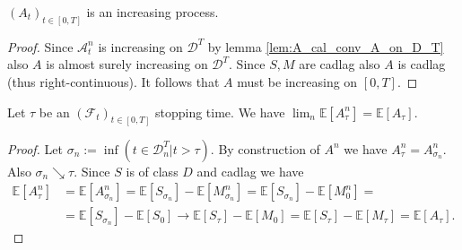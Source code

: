 \begin{lemma}\label{lem:A_increasing}
  $(A_t)_{t\in[0,T]}$ is an increasing process.
\end{lemma}
\begin{proof}
  Since $\mathcal{A}^n_t$ is increasing on $\mathcal{D}^T$ by lemma \ref{lem:A_cal_conv_A_on_D_T} also $A$ is almost surely increasing on $\mathcal{D}^T$.
  Since $S,M$ are cadlag also $A$ is cadlag (thus right-continuous). It follows that $A$ must be increasing on $[0,T]$.
\end{proof}

\begin{lemma}\label{lem:lim_Exp_A_n_tau_is_Exp_A_tau}
  Let $\tau$ be an $(\mathcal{F}_t)_{t\in[0,T]}$ stopping time. We have $\lim_n\mathbb{E}[A^n_\tau]=\mathbb{E}[A_\tau]$.
\end{lemma}
\begin{proof}
  Let $\sigma_n:=\inf\left(t\in\mathcal{D}^T_n\vert t>\tau\right)$. By construction of $A^n$ we have $A^n_\tau=A^n_{\sigma_n}$.
  Also $\sigma_n\searrow\tau$. Since $S$ is of class $D$ and cadlag we have
  \begin{align*}
    \mathbb{E}[A^n_\tau]&=\mathbb{E}[A^n_{\sigma_n}]=\mathbb{E}[S_{\sigma_n}]-\mathbb{E}[M^n_{\sigma_n}]=\mathbb{E}[S_{\sigma_n}]-\mathbb{E}[M^n_0]=\\
    &=\mathbb{E}[S_{\sigma_n}]-\mathbb{E}[S_0]\rightarrow \mathbb{E}[S_\tau]-\mathbb{E}[M_0]=\mathbb{E}[S_\tau]-\mathbb{E}[M_\tau]=\mathbb{E}[A_\tau].
  \end{align*}
\end{proof}

